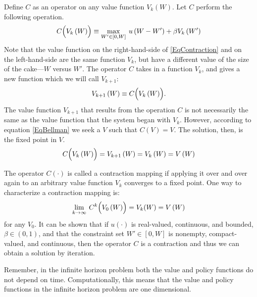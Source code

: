 Define $C$ as an operator on any value function $V_k\left(W\right)$. Let $C$ perform the following operation.
\begin{equation}\label{EqContraction}
   C\Bigl(V_k\left(W\right)\Bigr) \equiv \max_{W'\in[0,W]}\: u\left(W-W'\right) + \beta V_k\left(W'\right)
\end{equation}
Note that the value function on the right-hand-side of \eqref{EqContraction} and on the left-hand-side are the same function $V_k$, but have a different value of the size of the cake---$W$ versus $W'$. The operator $C$ takes in a function $V_k$, and gives a new function which we will call $V_{k+1}$:
\begin{equation}\label{EqContractionV}
   V_{k+1}\left(W\right) \equiv C\Bigl(V_k\left(W\right)\Bigr).
\end{equation}
The value function $V_{k+1}$ that results from the operation $C$ is not necessarily the same as the value function that the system began with $V_k$. However, according to equation \eqref{EqBellman} we seek a $V$ such that $C(V) = V$.  The solution, then, is the fixed point in $V$.
\begin{equation}
   C\Bigl(V_k\left(W\right)\Bigr) = V_{k+1}\left(W\right) = V_k\left(W\right) = V\left(W\right)
\end{equation}

The operator $C(\cdot)$ is called a contraction mapping if applying it over and over again to an arbitrary value function $V_k$ converges to a fixed point. One way to characterize a contraction mapping is:
\begin{equation}
   \lim_{k\rightarrow\infty}\: C^k\Bigl(V_0\left(W\right)\Bigr) = V_k(W) =  V\left(W\right)
\end{equation}
for any $V_0$.  It can be shown that if $u(\cdot)$ is real-valued, continuous, and bounded, $\beta\in(0,1)$, and that the constraint set $W'\in[0,W]$ is nonempty, compact-valued, and continuous, then the operator $C$ is a contraction and thus we can obtain a solution by iteration.

Remember, in the infinite horizon problem both the value and policy functions do not depend on time.  Computationally, this means that the value and policy functions in the infinite horizon problem are one dimensional.

